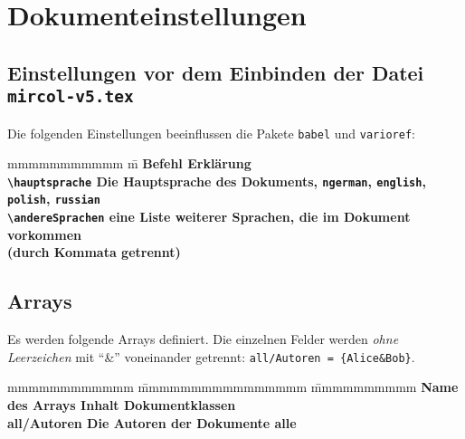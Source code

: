 	
	\section{Dokumenteinstellungen}
		\subsection{Einstellungen vor dem Einbinden der Datei \texttt{mircol-v5.tex}}
			Die folgenden Einstellungen beeinflussen die Pakete \texttt{babel} und \texttt{varioref}:
			\begin{tabbing}
				mmmmmmmmmmm 			\= m \kill
				\bf Befehl				\> \bf Erklärung \\
				\verb|\hauptsprache|	\> Die Hauptsprache des Dokuments, \zb \verb|ngerman|, \verb|english|, \\
										\> \verb|polish|, \verb|russian|  \\
				\verb|\andereSprachen|	\> eine Liste weiterer Sprachen, die im Dokument vorkommen \\
										\> (durch Kommata getrennt)
			\end{tabbing}
		\subsection{Arrays}
			Es werden folgende Arrays definiert. Die einzelnen Felder werden \emph{ohne Leerzeichen} mit "`\&"' voneinander getrennt: \verb|all/Autoren = {Alice&Bob}|.
			\begin{tabbing}
				mmmmmmmmmmmm 		\= mmmmmmmmmmmmmmmm				\=	mmmmmmmmmm	\kill
				\bf Name des Arrays	\> \bf Inhalt 					\> \bf Dokumentklassen\\
				 all/Autoren		\> Die Autoren der Dokumente	\> alle
			\end{tabbing}
